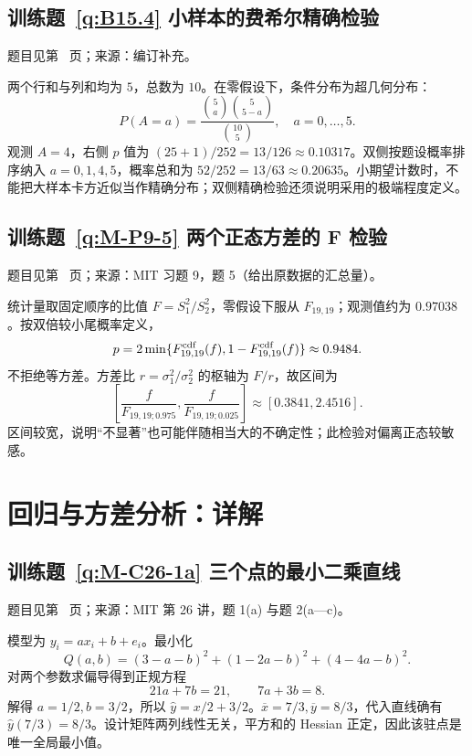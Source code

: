\documentclass[UTF8,12pt,a4paper,fontset=fandol]{ctexbook}
\begin{document}
\subsection*{训练题~\ref{q:B15.4} 小样本的费希尔精确检验}\label{a:B15.4}{\small 题目见第~\pageref{q:B15.4} 页；来源：编订补充。}
\begin{solve}两个行和与列和均为 $5$，总数为 $10$。在零假设下，条件分布为超几何分布：\[P(A=a)=\frac{\binom5a\binom5{5-a}}{\binom{10}5},\quad a=0,\ldots,5.\]观测 $A=4$，右侧 $p$ 值为 $(25+1)/252=13/126\approx0.10317$。双侧按题设概率排序纳入 $a=0,1,4,5$，概率总和为 $52/252=13/63\approx0.20635$。小期望计数时，不能把大样本卡方近似当作精确分布；双侧精确检验还须说明采用的极端程度定义。\end{solve}

\subsection*{训练题~\ref{q:M-P9-5} 两个正态方差的 F 检验}\label{a:M-P9-5}{\small 题目见第~\pageref{q:M-P9-5} 页；来源：MIT 习题 9，题 5（给出原数据的汇总量）。}
\begin{solve}统计量取固定顺序的比值 $F=S_1^2/S_2^2$，零假设下服从 $F_{19,19}$；观测值约为 $0.97038$。按双倍较小尾概率定义，\[p=2\min\{F_{19,19}^{\rm cdf}(f),1-F_{19,19}^{\rm cdf}(f)\}\approx0.9484.\]不拒绝等方差。方差比 $r=\sigma_1^2/\sigma_2^2$ 的枢轴为 $F/r$，故区间为\[\left[\frac{f}{F_{19,19;0.975}},\frac{f}{F_{19,19;0.025}}\right]\approx[0.3841,2.4516].\]区间较宽，说明“不显著”也可能伴随相当大的不确定性；此检验对偏离正态较敏感。\end{solve}

\clearpage\section*{回归与方差分析：详解}

\subsection*{训练题~\ref{q:M-C26-1a} 三个点的最小二乘直线}\label{a:M-C26-1a}{\small 题目见第~\pageref{q:M-C26-1a} 页；来源：MIT 第 26 讲，题 1(a) 与题 2(a—c)。}
\begin{solve}模型为 $y_i=a x_i+b+e_i$。最小化\[Q(a,b)=(3-a-b)^2+(1-2a-b)^2+(4-4a-b)^2.\]对两个参数求偏导得到正规方程\[21a+7b=21,\qquad7a+3b=8.\]解得 $a=1/2,b=3/2$，所以 $\widehat y=x/2+3/2$。$\overline x=7/3,\overline y=8/3$，代入直线确有 $\widehat y(7/3)=8/3$。设计矩阵两列线性无关，平方和的 Hessian 正定，因此该驻点是唯一全局最小值。\end{solve}
\end{document}

